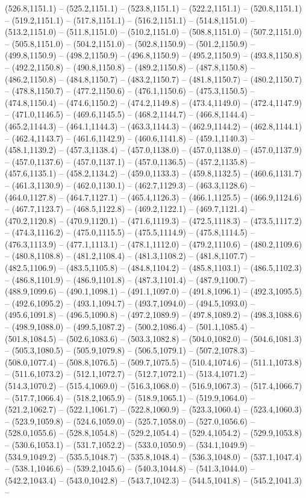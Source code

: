 (526.8,1151.1) -- (525.2,1151.1) -- (523.8,1151.1) -- (522.2,1151.1) -- (520.8,1151.1) -- (519.2,1151.1) -- (517.8,1151.1) -- (516.2,1151.1) -- (514.8,1151.0) -- (513.2,1151.0) -- (511.8,1151.0) -- (510.2,1151.0) -- (508.8,1151.0) -- (507.2,1151.0) -- (505.8,1151.0) -- (504.2,1151.0) -- (502.8,1150.9) -- (501.2,1150.9) -- (499.8,1150.9) -- (498.2,1150.9) -- (496.8,1150.9) -- (495.2,1150.9) -- (493.8,1150.8) -- (492.2,1150.8) -- (490.8,1150.8) -- (489.2,1150.8) -- (487.8,1150.8) -- (486.2,1150.8) -- (484.8,1150.7) -- (483.2,1150.7) -- (481.8,1150.7) -- (480.2,1150.7) -- (478.8,1150.7) -- (477.2,1150.6) -- (476.1,1150.6) -- (475.3,1150.5) -- (474.8,1150.4) -- (474.6,1150.2) -- (474.2,1149.8) -- (473.4,1149.0) -- (472.4,1147.9) -- (471.0,1146.5) -- (469.6,1145.5) -- (468.2,1144.7) -- (466.8,1144.4) -- (465.2,1144.3) -- (464.1,1144.3) -- (463.3,1144.3) -- (462.9,1144.2) -- (462.8,1144.1) -- (462.4,1143.7) -- (461.6,1142.9) -- (460.6,1141.8) -- (459.1,1140.3) -- (458.1,1139.2) -- (457.3,1138.4) -- (457.0,1138.0) -- (457.0,1138.0) -- (457.0,1137.9) -- (457.0,1137.6) -- (457.0,1137.1) -- (457.0,1136.5) -- (457.2,1135.8) -- (457.6,1135.1) -- (458.2,1134.2) -- (459.0,1133.3) -- (459.8,1132.5) -- (460.6,1131.7) -- (461.3,1130.9) -- (462.0,1130.1) -- (462.7,1129.3) -- (463.3,1128.6) -- (464.0,1127.8) -- (464.7,1127.1) -- (465.4,1126.3) -- (466.1,1125.5) -- (466.9,1124.6) -- (467.7,1123.7) -- (468.5,1122.8) -- (469.2,1122.1) -- (469.7,1121.4) -- (470.2,1120.8) -- (470.9,1120.1) -- (471.6,1119.3) -- (472.5,1118.3) -- (473.5,1117.2) -- (474.3,1116.2) -- (475.0,1115.5) -- (475.5,1114.9) -- (475.8,1114.5) -- (476.3,1113.9) -- (477.1,1113.1) -- (478.1,1112.0) -- (479.2,1110.6) -- (480.2,1109.6) -- (480.8,1108.8) -- (481.2,1108.4) -- (481.3,1108.2) -- (481.8,1107.7) -- (482.5,1106.9) -- (483.5,1105.8) -- (484.8,1104.2) -- (485.8,1103.1) -- (486.5,1102.3) -- (486.8,1101.9) -- (486.9,1101.8) -- (487.3,1101.4) -- (487.9,1100.7) -- (488.9,1099.6) -- (490.1,1098.1) -- (491.1,1097.0) -- (491.8,1096.1) -- (492.3,1095.5) -- (492.6,1095.2) -- (493.1,1094.7) -- (493.7,1094.0) -- (494.5,1093.0) -- (495.6,1091.8) -- (496.5,1090.8) -- (497.2,1089.9) -- (497.8,1089.2) -- (498.3,1088.6) -- (498.9,1088.0) -- (499.5,1087.2) -- (500.2,1086.4) -- (501.1,1085.4) -- (501.8,1084.5) -- (502.6,1083.6) -- (503.3,1082.8) -- (504.0,1082.0) -- (504.6,1081.3) -- (505.3,1080.5) -- (505.9,1079.8) -- (506.5,1079.1) -- (507.2,1078.3) -- (508.0,1077.4) -- (508.8,1076.5) -- (509.7,1075.5) -- (510.4,1074.6) -- (511.1,1073.8) -- (511.6,1073.2) -- (512.1,1072.7) -- (512.7,1072.1) -- (513.4,1071.2) -- (514.3,1070.2) -- (515.4,1069.0) -- (516.3,1068.0) -- (516.9,1067.3) -- (517.4,1066.7) -- (517.7,1066.4) -- (518.2,1065.9) -- (518.9,1065.1) -- (519.9,1064.0) -- (521.2,1062.7) -- (522.1,1061.7) -- (522.8,1060.9) -- (523.3,1060.4) -- (523.4,1060.3) -- (523.9,1059.8) -- (524.6,1059.0) -- (525.7,1058.0) -- (527.0,1056.6) -- (528.0,1055.6) -- (528.8,1054.8) -- (529.2,1054.4) -- (529.4,1054.2) -- (529.9,1053.8) -- (530.6,1053.1) -- (531.7,1052.2) -- (533.0,1050.9) -- (534.1,1049.9) -- (534.9,1049.2) -- (535.5,1048.7) -- (535.8,1048.4) -- (536.3,1048.0) -- (537.1,1047.4) -- (538.1,1046.6) -- (539.2,1045.6) -- (540.3,1044.8) -- (541.3,1044.0) -- (542.2,1043.4) -- (543.0,1042.8) -- (543.7,1042.3) -- (544.5,1041.8) -- (545.2,1041.3) -- 